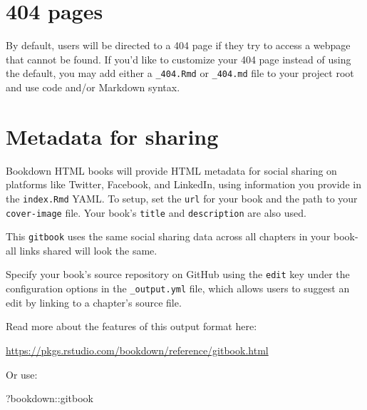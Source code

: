 \documentclass[
]{book}
\newenvironment{Shaded}{\begin{snugshade}}{\end{snugshade}}
\newcommand{\NormalTok}[1]{#1}
\newcommand{\SpecialCharTok}[1]{\textcolor[rgb]{0.00,0.00,0.00}{#1}}
\theoremstyle{definition}
\theoremstyle{definition}
\theoremstyle{definition}
\theoremstyle{definition}
\theoremstyle{remark}
\begin{document}
\hypertarget{pages}{%
\section{404 pages}\label{pages}}

By default, users will be directed to a 404 page if they try to access a webpage that cannot be found. If you'd like to customize your 404 page instead of using the default, you may add either a \texttt{\_404.Rmd} or \texttt{\_404.md} file to your project root and use code and/or Markdown syntax.

\hypertarget{metadata-for-sharing}{%
\section{Metadata for sharing}\label{metadata-for-sharing}}

Bookdown HTML books will provide HTML metadata for social sharing on platforms like Twitter, Facebook, and LinkedIn, using information you provide in the \texttt{index.Rmd} YAML. To setup, set the \texttt{url} for your book and the path to your \texttt{cover-image} file. Your book's \texttt{title} and \texttt{description} are also used.

This \texttt{gitbook} uses the same social sharing data across all chapters in your book- all links shared will look the same.

Specify your book's source repository on GitHub using the \texttt{edit} key under the configuration options in the \texttt{\_output.yml} file, which allows users to suggest an edit by linking to a chapter's source file.

Read more about the features of this output format here:

\url{https://pkgs.rstudio.com/bookdown/reference/gitbook.html}

Or use:

\begin{Shaded}
\begin{Highlighting}[]
\NormalTok{?bookdown}\SpecialCharTok{::}\NormalTok{gitbook}
\end{Highlighting}
\end{Shaded}


  
\end{document}
